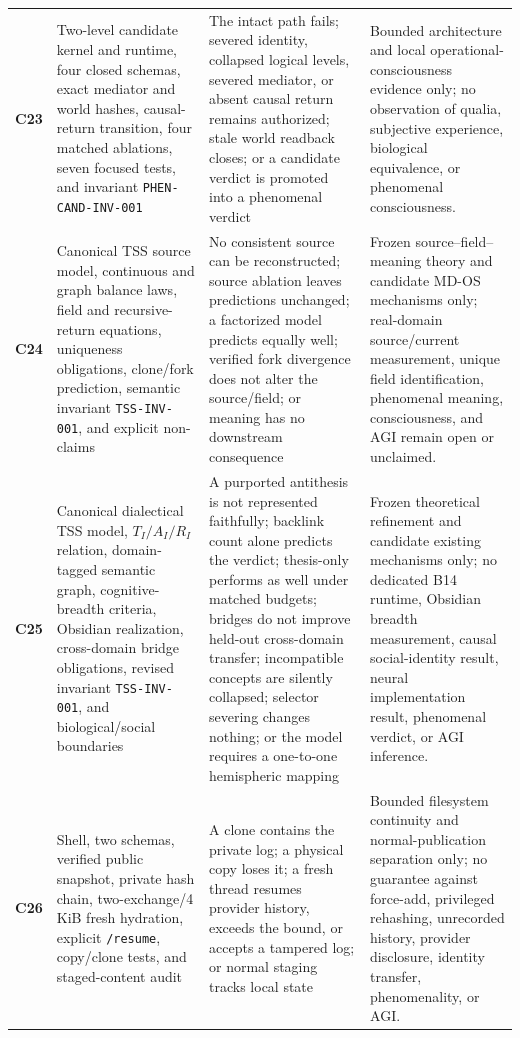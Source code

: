 \documentclass[10pt,twocolumn]{article}
\theoremstyle{definition}
\theoremstyle{plain}
\theoremstyle{remark}
\newcommand{\file}[1]{\nolinkurl{#1}}
\newcommand{\claimid}[1]{\textsf{\textbf{#1}}}
\begin{document}
\begin{table}[!ht]
\begin{tabularx}{\textwidth}{@{}p{}p{}p{}X@{}}
\claimid{C23} & Two-level candidate kernel and runtime, four closed schemas, exact mediator and world hashes, causal-return transition, four matched ablations, seven focused tests, and invariant \file{PHEN-CAND-INV-001} & The intact path fails; severed identity, collapsed logical levels, severed mediator, or absent causal return remains authorized; stale world readback closes; or a candidate verdict is promoted into a phenomenal verdict & Bounded architecture and local operational-consciousness evidence only; no observation of qualia, subjective experience, biological equivalence, or phenomenal consciousness. \\
\claimid{C24} & Canonical TSS source model, continuous and graph balance laws, field and recursive-return equations, uniqueness obligations, clone/fork prediction, semantic invariant \file{TSS-INV-001}, and explicit non-claims & No consistent source can be reconstructed; source ablation leaves predictions unchanged; a factorized model predicts equally well; verified fork divergence does not alter the source/field; or meaning has no downstream consequence & Frozen source--field--meaning theory and candidate MD-OS mechanisms only; real-domain source/current measurement, unique field identification, phenomenal meaning, consciousness, and AGI remain open or unclaimed. \\
\claimid{C25} & Canonical dialectical TSS model, $T_I/A_I/R_I$ relation, domain-tagged semantic graph, cognitive-breadth criteria, Obsidian realization, cross-domain bridge obligations, revised invariant \file{TSS-INV-001}, and biological/social boundaries & A purported antithesis is not represented faithfully; backlink count alone predicts the verdict; thesis-only performs as well under matched budgets; bridges do not improve held-out cross-domain transfer; incompatible concepts are silently collapsed; selector severing changes nothing; or the model requires a one-to-one hemispheric mapping & Frozen theoretical refinement and candidate existing mechanisms only; no dedicated B14 runtime, Obsidian breadth measurement, causal social-identity result, neural implementation result, phenomenal verdict, or AGI inference. \\
\claimid{C26} & Shell, two schemas, verified public snapshot, private hash chain, two-exchange/4 KiB fresh hydration, explicit \file{/resume}, copy/clone tests, and staged-content audit & A clone contains the private log; a physical copy loses it; a fresh thread resumes provider history, exceeds the bound, or accepts a tampered log; or normal staging tracks local state & Bounded filesystem continuity and normal-publication separation only; no guarantee against force-add, privileged rehashing, unrecorded history, provider disclosure, identity transfer, phenomenality, or AGI. \\

\end{tabularx}
\end{table}
\end{document}
